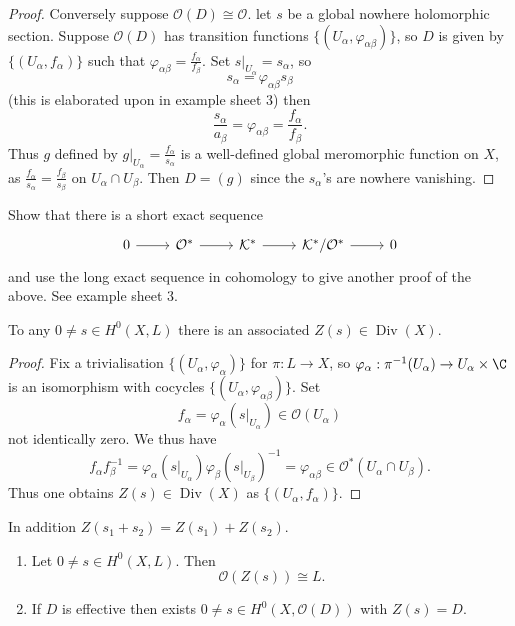\documentclass[a4paper]{article}
\DeclareMathOperator{\Div}{Div} %
\begin{document}
\begin{proof}
  Conversely suppose \(\mathcal O(D) \cong \mathcal O\). let \(s\) be a global nowhere holomorphic section. Suppose \(\mathcal O(D)\) has transition functions \(\{(U_\alpha, \varphi_{\alpha\beta})\}\), so \(D\) is given by \(\{(U_\alpha, f_\alpha)\}\) such that \(\varphi_{\alpha\beta} = \frac{f_\alpha}{f_\beta}\). Set \(s|_{U_\alpha} = s_\alpha\), so
  \[
    s_\alpha = \varphi_{\alpha\beta} s_\beta
  \]
  (this is elaborated upon in example sheet 3) then
  \[
    \frac{s_\alpha}{a_\beta} = \varphi_{\alpha\beta} = \frac{f_\alpha}{f_\beta}.
  \]
  Thus \(g\) defined by \(g|_{U_\alpha} = \frac{f_\alpha}{s_\alpha}\) is a well-defined global meromorphic function on \(X\), as \(\frac{f_\alpha}{s_\alpha} = \frac{f_\beta}{s_\beta}\) on \(U_\alpha \cap U_\beta\). Then \(D = (g)\) since the \(s_\alpha\)'s are nowhere vanishing.
\end{proof}

\begin{ex}
  Show that there is a short exact sequence
  \[
    \begin{tikzcd}
      0 \ar[r] & \mathcal O^* \ar[r] & \mathcal K^* \ar[r] & \mathcal K^*/\mathcal O^* \ar[r] & 0
    \end{tikzcd}
  \]
  and use the long exact sequence in cohomology to give another proof of the above. See example sheet 3.
\end{ex}

\begin{proposition}
  To any \(0 \neq s \in H^0(X, L)\) there is an associated \(Z(s) \in \Div(X)\).
\end{proposition}

\begin{proof}
  Fix a trivialisation \(\{(U_\alpha, \varphi_\alpha)\}\) for \(\pi: L \to X\), so \(\varphi_\alpha: \pi^{-1}(U_\alpha) \to U_\alpha \times \C\) is an isomorphism with cocycles \(\{(U_\alpha, \varphi_{\alpha\beta})\}\). Set
  \[
    f_\alpha = \varphi_\alpha(s|_{U_\alpha}) \in \mathcal O(U_\alpha)
  \]
  not identically zero. We thus have
  \[
    f_\alpha f_\beta^{-1}
    = \varphi_\alpha(s|_{U_\alpha}) \varphi_\beta(s|_{U_\beta})^{-1}
    = \varphi_{\alpha\beta} \in \mathcal O^*(U_\alpha \cap U_\beta).
  \]
  Thus one obtains \(Z(s) \in \Div(X)\) as \(\{(U_\alpha, f_\alpha)\}\).
\end{proof}
In addition \(Z(s_1 + s_2) = Z(s_1) + Z(s_2)\).

\begin{proposition}\leavevmode
  \begin{enumerate}
  \item Let \(0 \neq s \in H^0(X, L)\). Then
    \[
      \mathcal O(Z(s)) \cong L.
    \]
  \item If \(D\) is effective then exists \(0 \neq s \in H^0(X, \mathcal O(D))\) with \(Z(s) = D\).
  \end{enumerate}
\end{proposition}
\end{document}
